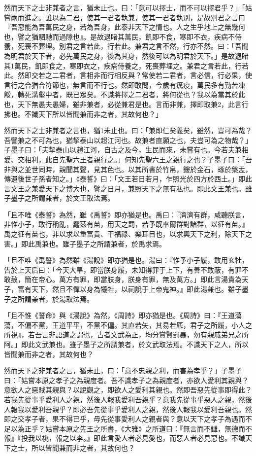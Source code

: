 \begin{pinyinscope}
然而天下之士非兼者之言，猶未止也。曰：「意可以擇士，而不可以擇君乎？」「姑嘗兩而進之。誰以為二君，使其一君者執兼，使其一君者執別，是故別君之言曰『吾惡能為吾萬民之身，若為吾身，此泰非天下之情也。人之生乎地上之無幾何也，譬之猶駟馳而過隙也』。是故退睹其萬民，飢即不食，寒即不衣，疾病不侍養，死喪不葬埋。別君之言若此，行若此。兼君之言不然，行亦不然。曰：「吾聞為明君於天下者，必先萬民之身，後為其身，然後可以為明君於天下。」是故退睹其1萬民，飢即食之，寒即衣之，疾病侍養之，死喪葬埋之。兼君之言若此，行若此。然即交若之二君者，言相非而行相反與？常使若二君者，言必信，行必果，使言行之合猶合符節也，無言而不行也。然即敢問，今歲有癘疫，萬民多有勤苦凍餒，轉死溝壑中者，既已眾矣。不識將擇之二君者，將何從也？我以為當其於此也，天下無愚夫愚婦，雖非兼者，必從兼君是也。言而非兼，擇即取兼2，此言行拂也。不識天下所以皆聞兼而非之者，其故何也？」

然而天下之士非兼者之言也，猶1未止也。曰：「兼即仁矣義矣，雖然，豈可為哉？吾譬兼之不可為也，猶挈泰山以超江河也。故兼者直願之也，夫豈可為之物哉？」子墨子曰：「夫挈泰山以趙江河，自古之及今，生民而來，未嘗有也。今若夫兼相愛、交相利，此自先聖六王者親行之。」何知先聖六王之親行之也？子墨子曰：「吾非與之並世同時，親聞其聲，見其色也。以其所書於竹帛，鏤於金石，琢於槃盂，傳遺後世子孫者知之。」《泰誓》曰：「文王若日若月，乍照光於四方於西土。」即此言文王之兼愛天下之博大也，譬之日月，兼照天下之無有私也。即此文王兼也。雖子墨子之所謂兼者，於文王取法焉。

「且不唯《泰誓》為然，雖《禹誓》即亦猶是也。禹曰：『濟濟有群，咸聽朕言，非惟小子，敢行稱亂，蠢茲有苗，用天之罰，若予既率爾群對諸群，以征有苗。』禹之征有苗也，非以求以重富貴、干福祿、樂耳目也，以求興天下之利，除天下之害。」即此禹兼也。雖子墨子之所謂兼者，於禹求焉。

「且不唯《禹誓》為然雖《湯說》即亦猶是也。湯曰：『惟予小子履，敢用玄牡，告於上天后曰：「今天大旱，即當朕身履，未知得罪于上下，有善不敢蔽，有罪不敢赦，簡在帝心。萬方有罪，即當朕身，朕身有罪，無及萬方。」即此言湯貴為天子，富有天下，然且不憚以身為犧牲，以祠說于上帝鬼神。』即此湯兼也。雖子墨子之所謂兼者，於湯取法焉。

「且不惟《誓命》與《湯說》為然，《周詩》即亦猶是也。《周詩》曰：『王道蕩蕩，不偏不黨，王道平平，不黨不偏。其直若矢，其易若厎，君子之所履，小人之所視』，若吾言非語道之謂也，古者文武為正，均分賞賢罰暴，勿有親戚弟兄之所阿。」即此文武兼也。雖子墨子之所謂兼者，於文武取法焉。不識天下之人，所以皆聞兼而非之者，其故何也？

然而天下之非兼者之言，猶未止，曰：「意不忠親之利，而害為孝乎？」子墨子曰：「姑嘗本原之孝子之為親度者。吾不識孝子之為親度者，亦欲人愛利其親與？意欲人之惡賊其親與？以說觀之，即欲人之愛利其親也。然即吾惡先從事即得此？若我先從事乎愛利人之親，然後人報我愛利吾親乎？意我先從事乎惡人之親，然後人報我以愛利吾親乎？即必吾先從事乎愛利人之親，然後人報我以愛利吾親也。然即之交孝子者，果不得已乎，毋先從事愛利人之親者與？意以天下之孝子為遇而不足以為正乎？姑嘗本原之先王之所書，《大雅》之所道曰：『無言而不讎，無德而不報』『投我以桃，報之以李。』即此言愛人者必見愛也，而惡人者必見惡也。不識天下之士，所以皆聞兼而非之者，其故何也？


\end{pinyinscope}

